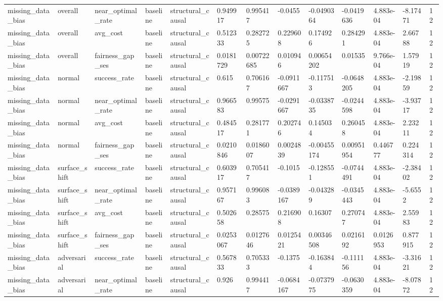 \begin{tabular}{lllllllllllll}
missing\_data\_bias & overall & near\_optimal\_rate & baseline & structural\_causal & 0.949917 & 0.995417 & -0.0455 & -0.0490364 & -0.0419636 & 4.883e-04 & -8.17471 & 12 \\
missing\_data\_bias & overall & avg\_cost & baseline & structural\_causal & 0.512333 & 0.282725 & 0.229608 & 0.174926 & 0.284291 & 4.883e-04 & 2.66788 & 12 \\
missing\_data\_bias & overall & fairness\_gap\_ses & baseline & structural\_causal & 0.0181729 & 0.00722685 & 0.010946 & 0.00654202 & 0.01535 & 9.766e-04 & 1.57919 & 12 \\
missing\_data\_bias & normal & success\_rate & baseline & structural\_causal & 0.615 & 0.706167 & -0.0911667 & -0.117513 & -0.0648205 & 4.883e-04 & -2.19859 & 12 \\
missing\_data\_bias & normal & near\_optimal\_rate & baseline & structural\_causal & 0.966583 & 0.99575 & -0.0291667 & -0.0338735 & -0.0244598 & 4.883e-04 & -3.93717 & 12 \\
missing\_data\_bias & normal & avg\_cost & baseline & structural\_causal & 0.484517 & 0.281771 & 0.202746 & 0.145034 & 0.260458 & 4.883e-04 & 2.23211 & 12 \\
missing\_data\_bias & normal & fairness\_gap\_ses & baseline & structural\_causal & 0.0210846 & 0.0186007 & 0.0024839 & -0.00455174 & 0.00951954 & 0.446777 & 0.224314 & 12 \\
missing\_data\_bias & surface\_shift & success\_rate & baseline & structural\_causal & 0.603917 & 0.705417 & -0.1015 & -0.128551 & -0.0744491 & 4.883e-04 & -2.38402 & 12 \\
missing\_data\_bias & surface\_shift & near\_optimal\_rate & baseline & structural\_causal & 0.957167 & 0.996083 & -0.0389167 & -0.043289 & -0.0345443 & 4.883e-04 & -5.6552 & 12 \\
missing\_data\_bias & surface\_shift & avg\_cost & baseline & structural\_causal & 0.502658 & 0.28575 & 0.216908 & 0.16307 & 0.270747 & 4.883e-04 & 2.55983 & 12 \\
missing\_data\_bias & surface\_shift & fairness\_gap\_ses & baseline & structural\_causal & 0.0253067 & 0.0127646 & 0.0125421 & 0.00346508 & 0.0216192 & 0.0126953 & 0.877915 & 12 \\
missing\_data\_bias & adversarial & success\_rate & baseline & structural\_causal & 0.567833 & 0.705333 & -0.1375 & -0.163844 & -0.111156 & 4.883e-04 & -3.31621 & 12 \\
missing\_data\_bias & adversarial & near\_optimal\_rate & baseline & structural\_causal & 0.926 & 0.994417 & -0.0684167 & -0.0737975 & -0.0630359 & 4.883e-04 & -8.07872 & 12 \\

\end{tabular}
